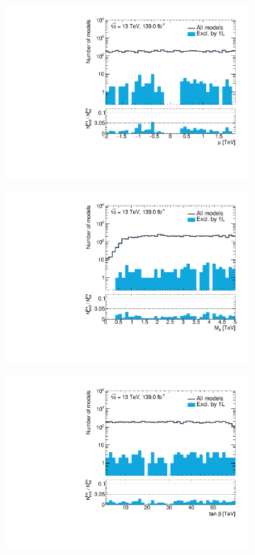 \begin{figure}
\begin{subfigure}[b]{0.5\linewidth}
		\centering\includegraphics[width=\textwidth]{1D/mu}
	\end{subfigure}\hfill
	\begin{subfigure}[b]{0.5\linewidth}
		\centering\includegraphics[width=\textwidth]{1D/mA}
	\end{subfigure}\hfill
	\begin{subfigure}[b]{0.5\linewidth}
		\centering\includegraphics[width=\textwidth]{1D/tanb}

\end{subfigure}
\end{figure}

